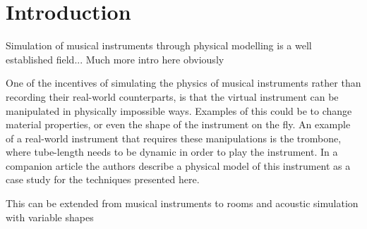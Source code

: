 \documentclass[dvipsnames, preprint]{JASA}
\def\SWcomment[#1]{\textcolor{Bittersweet}{#1}}
\begin{document}



\section{\label{sec:introduction} Introduction}
Simulation of musical instruments through physical modelling is a well established field... 
\SWcomment[Much more intro here obviously]{}



One of the incentives of simulating the physics of musical instruments rather than recording their real-world counterparts, is that the virtual instrument can be manipulated in physically impossible ways. Examples of this could be to change material properties, or even the shape of the instrument on the fly. An example of a real-world instrument that requires these manipulations is the trombone, where tube-length needs to be dynamic in order to play the instrument. In a companion article the authors describe a physical model of this instrument as a case study for the techniques presented here. 

This can be extended from musical instruments to rooms and acoustic simulation with variable shapes
\end{document}
